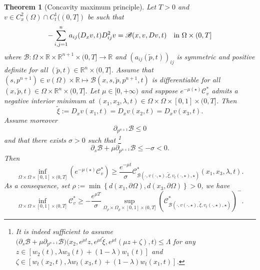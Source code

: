 \documentclass[11pt, reqno]{amsart}
\newtheorem{theorem}[lemma]{Theorem}
\theoremstyle{definition}
\numberwithin{equation}{section}
\newcommand{\R}{\mathbb{R}}
\newcommand{\mc}[1]{\mathcal{#1}}
\begin{document}
\begin{theorem}[Concavity maximum principle]
\label{thm_conc_princ_eigenf}
Let $T>0$ and $v \in C^2_x(\Omega) \cap C^1_t((0,T])$ be such that
\[ - \sum_{i,j=1}^n a_{ij}(D_x v, t) D^2_{ij} v = \mathscr{B}(x,v,D v, t) \quad \hbox{in $\Omega \times (0,T]$} \]
	where $\mathscr{B}\colon \Omega\times \R\times \R^{n+1} \times (0,T]\to \R $ and $(a_{ij}(\tilde{p},t))_{ij}$ is symmetric and positive definite for all $(\tilde{p},t)\in \R^{n} \times (0,T]$. 
	Assume that $(s, p^{n+1})\in v(\Omega) \times \R \mapsto \mathscr{B}(x,s,\tilde{p}, p^{n+1}, t)$ is differentiable 
	for all $(x,\tilde{p},t)\in \Omega\times \R^{n} \times (0,T]$. 
	Let $\mu \in [0,+\infty)$ and suppose $e^{-\mu (\star)}\mathcal{C}^*_v$ admits a negative interior minimum at $(x_1,x_3,\lambda,t)\in \Omega \times \Omega\times [0,1] \times (0,T]$. 
	Then
	\begin{equation}\label{eq_def_xi*}
	\tilde{\xi}:=D_xv(x_1,t)=D_xv(x_2,t)=D_xv(x_3,t).
	\end{equation}
Assume moreover 
$$\partial_{p^{n+1}} \mathscr{B} \leq 0$$
and that there exists $\sigma >0 $ such that%
\footnote{It is indeed sufficient to assume
$\big(\partial_s \mathscr{B}+ \mu \partial_{p^{n+1}} \mathscr{B}\big)\big(x_2, e^{\mu t} z, e^{\mu t} \tilde{\xi}, e^{\mu t}( \mu z + \zeta), t\big) \leq \Lambda$
for any $z \in [w_2(t), \lambda w_3(t)+(1-\lambda)w_1(t)]$ and $\zeta \in [w_t(x_2,t), \lambda w_t(x_3,t) + (1-\lambda) w_t(x_1,t)]$.
}
$$ \partial_s \mathscr{B} + \mu \partial_{p^{n+1}} \mathscr{B} \leq -\sigma <0.$$
Then
$$ \inf_{\Omega \times \Omega \times [0,1] \times (0,T]} \left( e^{-\mu (\star)}\mc{C}^*_v \right) \geq \frac{e^{-\mu t}}{\sigma} \mc{C}^*_{\mathscr{B}(\cdot, v(\cdot, \star), \tilde{\xi}, v_t(\cdot, \star), \star)} (x_1, x_3, \lambda, t).$$
As a consequence, set $\rho:=\min \left\{d(x_1,\partial\Omega),d(x_3,\partial \Omega)\right\}>0$, we have
\[ \inf_{\Omega \times \Omega \times [0,1] \times (0,T]} \mathcal{C}^*_v \geq - \frac{e^{\mu T}}{\sigma} \sup_{\Omega_{\rho} \times \Omega_{\rho} \times [0,1] \times (0,T]} \left(\mc{C}^*_{\mathscr{B}(\cdot, v(\cdot, \star), \tilde{\xi}, v_t(\cdot, \star), \star)}\right)^- .\]
\end{theorem}
\end{document}
